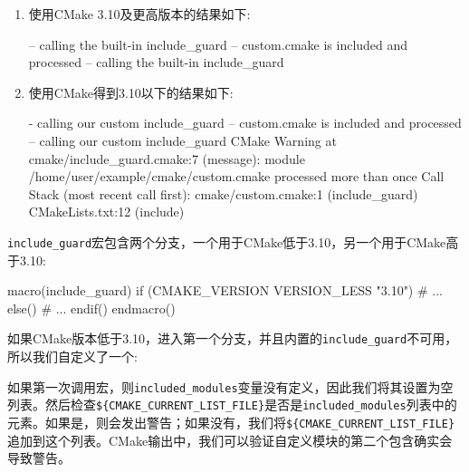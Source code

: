 \begin{enumerate}
\item 使用CMake 3.10及更高版本的结果如下:

\begin{codebox}[shell]
-- calling the built-in include_guard
-- custom.cmake is included and processed
-- calling the built-in include_guard
\end{codebox}

\item 使用CMake得到3.10以下的结果如下:

\begin{codebox}[shell]
- calling our custom include_guard
-- custom.cmake is included and processed
-- calling our custom include_guard
CMake Warning at cmake/include_guard.cmake:7 (message):
module
/home/user/example/cmake/custom.cmake
processed more than once
Call Stack (most recent call first):
cmake/custom.cmake:1 (include_guard)
CMakeLists.txt:12 (include)
\end{codebox}

\end{enumerate}


\texttt{include\_guard}宏包含两个分支，一个用于CMake低于3.10，另一个用于CMake高于3.10:

\begin{codebox}[cmake]
macro(include_guard)
  if (CMAKE_VERSION VERSION_LESS "3.10")
    # ...
  else()
    # ...
  endif()
endmacro()
\end{codebox}

如果CMake版本低于3.10，进入第一个分支，并且内置的\texttt{include\_guard}不可用，所以我们自定义了一个:


如果第一次调用宏，则\texttt{included\_modules}变量没有定义，因此我们将其设置为空列表。然后检查\texttt{\$\{CMAKE\_CURRENT\_LIST\_FILE\}}是否是\texttt{included\_modules}列表中的元素。如果是，则会发出警告；如果没有，我们将\texttt{\$\{CMAKE\_CURRENT\_LIST\_FILE\}}追加到这个列表。CMake输出中，我们可以验证自定义模块的第二个包含确实会导致警告。

